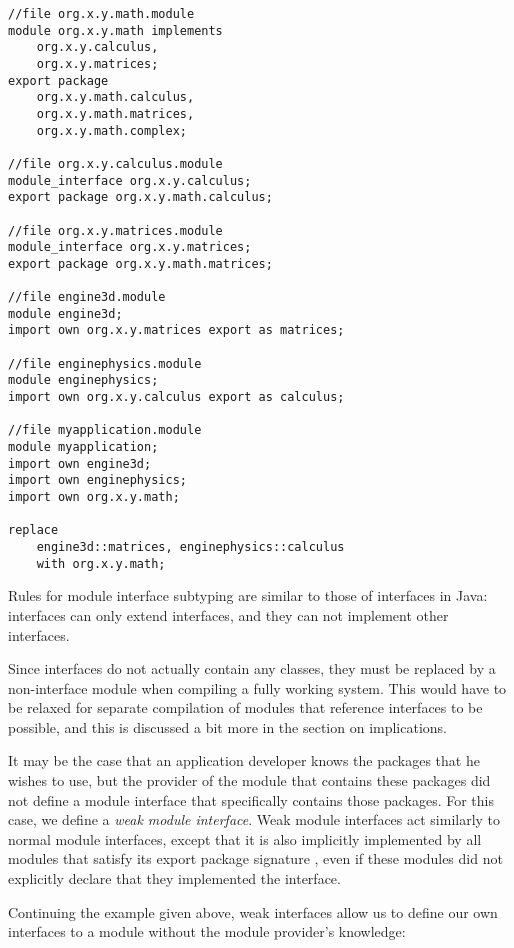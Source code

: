 \begin{lstlisting}[caption=Module Interfaces]
//file org.x.y.math.module
module org.x.y.math implements 
	org.x.y.calculus,
	org.x.y.matrices;
export package 
	org.x.y.math.calculus,
	org.x.y.math.matrices,
	org.x.y.math.complex;
	
//file org.x.y.calculus.module
module_interface org.x.y.calculus;
export package org.x.y.math.calculus;

//file org.x.y.matrices.module
module_interface org.x.y.matrices;
export package org.x.y.math.matrices;

//file engine3d.module
module engine3d;
import own org.x.y.matrices export as matrices;

//file enginephysics.module
module enginephysics;
import own org.x.y.calculus export as calculus;

//file myapplication.module
module myapplication;
import own engine3d;
import own enginephysics;
import own org.x.y.math;

replace 
	engine3d::matrices, enginephysics::calculus
	with org.x.y.math;
\end{lstlisting}

Rules for module interface subtyping are similar to those of interfaces in Java:
interfaces can only extend interfaces, and they can not implement other
interfaces. 

Since interfaces do not actually contain any classes, they must be replaced
by a non-interface module when compiling a fully working system. This would
have to be relaxed for separate compilation of modules that reference interfaces
to be possible, and this is discussed a bit more in the section on implications.


It may be the case that an application developer knows the packages that
he wishes to use, but the provider of the module that contains these packages 
did not define a module interface that specifically contains those packages. For
this case, we define a \textit{weak module interface}. Weak module interfaces act similarly
to normal module interfaces, except that it is also implicitly implemented
by all modules that satisfy its export package signature \cite{mcdirmid01jiazzi, componentnextgen}, 
even if these modules did not explicitly declare that they implemented the interface.

Continuing the example given above, weak interfaces allow us to define 
our own interfaces to a module without the module provider's knowledge:


